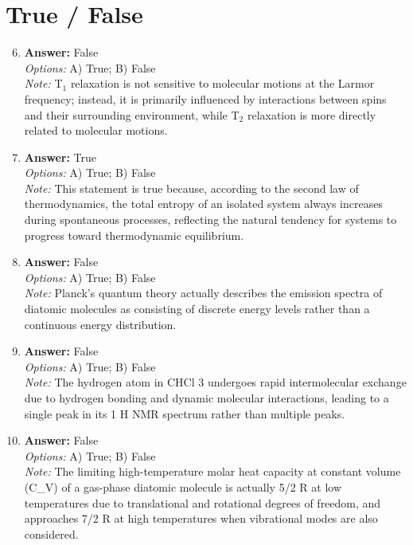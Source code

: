 \documentclass[12pt]{article}
\begin{document}
\section*{True / False}
\begin{enumerate}[label=\arabic*.]
\setcounter{enumi}{5}
\item \textbf{Answer:} False
\\ \textit{Options:} A) True; B) False
\\ \textit{Note:} T$_{1}$ relaxation is not sensitive to molecular motions at the Larmor frequency; instead, it is primarily influenced by interactions between spins and their surrounding environment, while T$_{2}$ relaxation is more directly related to molecular motions.
\item \textbf{Answer:} True
\\ \textit{Options:} A) True; B) False
\\ \textit{Note:} This statement is true because, according to the second law of thermodynamics, the total entropy of an isolated system always increases during spontaneous processes, reflecting the natural tendency for systems to progress toward thermodynamic equilibrium.
\item \textbf{Answer:} False
\\ \textit{Options:} A) True; B) False
\\ \textit{Note:} Planck's quantum theory actually describes the emission spectra of diatomic molecules as consisting of discrete energy levels rather than a continuous energy distribution.
\item \textbf{Answer:} False
\\ \textit{Options:} A) True; B) False
\\ \textit{Note:} The hydrogen atom in CHCl 3 undergoes rapid intermolecular exchange due to hydrogen bonding and dynamic molecular interactions, leading to a single peak in its 1 H NMR spectrum rather than multiple peaks.
\item \textbf{Answer:} False
\\ \textit{Options:} A) True; B) False
\\ \textit{Note:} The limiting high-temperature molar heat capacity at constant volume (C\_V) of a gas-phase diatomic molecule is actually 5/2 R at low temperatures due to translational and rotational degrees of freedom, and approaches 7/2 R at high temperatures when vibrational modes are also considered.
\end{enumerate}
\end{document}
